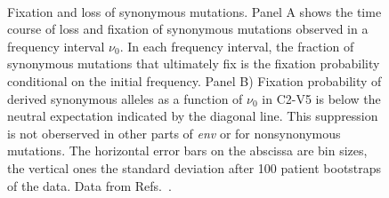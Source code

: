 \documentclass[rmp, twocolumn]{revtex4}
\begin{document}
\begin{figure}
\begin{center}
\\
\caption{Fixation and loss of synonymous mutations. Panel A shows the time
course of loss and fixation of synonymous mutations observed in a frequency interval $\nu_0$. 
In each frequency interval, the  fraction of synonymous
mutations that ultimately fix is the fixation probability conditional on the
initial frequency.
Panel B) Fixation probability of derived synonymous
alleles as a function of $\nu_0$ in C2-V5 is below the neutral
expectation indicated by the diagonal line. This suppression is not
oberserved in other parts of {\it env} or for nonsynonymous mutations.
The horizontal error bars on the abscissa are bin sizes, the vertical ones the
standard deviation after 100 patient bootstraps of the data. Data from
Refs.~\cite{shankarappa_consistent_1999, bunnik_autologous_2008}.}
\label{fig:fixp}
\end{center}
\end{figure}
\end{document}
